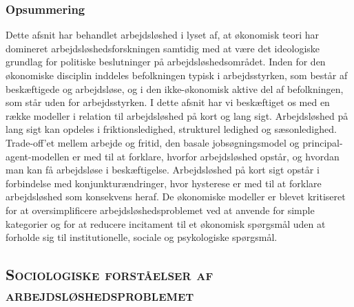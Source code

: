 \subsubsection{Opsummering}

Dette afsnit har behandlet arbejdsløshed i lyset af, at økonomisk teori har domineret arbejdsløshedsforskningen samtidig med at være det ideologiske grundlag for politiske beslutninger på arbejdsløshedsområdet. Inden for den økonomiske disciplin inddeles befolkningen typisk i arbejdsstyrken, som består af beskæftigede og arbejdsløse, og i den ikke-økonomisk aktive del af befolkningen, som står uden for arbejdsstyrken. I dette afsnit har vi beskæftiget os med en række modeller i relation til arbejdsløshed på kort og lang sigt. Arbejdsløshed på lang sigt kan opdeles i friktionsledighed, strukturel ledighed og sæsonledighed. Trade-off'et mellem arbejde og fritid, den basale jobsøgningsmodel og principal-agent-modellen er med til at forklare, hvorfor arbejdsløshed opstår, og hvordan man kan få arbejdsløse i beskæftigelse. Arbejdsløshed på kort sigt  opstår i forbindelse med konjunkturændringer, hvor hysterese er med til at forklare arbejdsløshed som konsekvens heraf. De økonomiske modeller er blevet kritiseret for at oversimplificere arbejdsløshedsproblemet ved at anvende for simple kategorier og for at reducere incitament til et økonomisk spørgsmål uden at forholde sig til institutionelle, sociale og psykologiske spørgsmål.







\newpage \subsection{\textsc{Sociologiske forståelser af arbejdsløshedsproblemet}}

